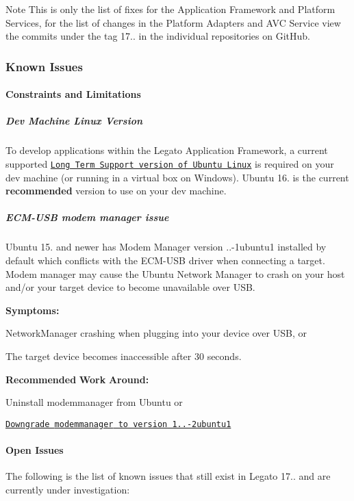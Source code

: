 \begin{DoxyNote}{Note}
This is only the list of fixes for the Application Framework and Platform Services, for the list of changes in the Platform Adapters and A\+VC Service view the commits under the tag 17.. in the individual repositories on Git\+Hub.
\end{DoxyNote}
\hypertarget{releaseNotes17100_rn1710_KnownIssues}{}\subsubsection{Known Issues}\label{releaseNotes17100_rn1710_KnownIssues}
\hypertarget{releaseNotes17100_rn1710_Constraints}{}\paragraph{Constraints and Limitations}\label{releaseNotes17100_rn1710_Constraints}
\hypertarget{releaseNotes17100_rn1710_ContraintsLinuxSupport}{}\subparagraph{Dev Machine Linux Version}\label{releaseNotes17100_rn1710_ContraintsLinuxSupport}
To develop applications within the Legato Application Framework, a current supported \href{https://www.ubuntu.com/info/release-end-of-life}{\tt Long Term Support version of Ubuntu Linux} is required on your dev machine (or running in a virtual box on Windows). Ubuntu 16. is the current {\bfseries recommended} version to use on your dev machine.\hypertarget{releaseNotes17100_rn1710_ConstECMUSB}{}\subparagraph{E\+C\+M-\/\+U\+S\+B modem manager issue}\label{releaseNotes17100_rn1710_ConstECMUSB}
Ubuntu 15. and newer has Modem Manager version {..-\/1ubuntu1} installed by default which conflicts with the E\+C\+M-\/\+U\+SB driver when connecting a target. Modem manager may cause the Ubuntu Network Manager to crash on your host and/or your target device to become unavailable over U\+SB.

{\bfseries Symptoms\+:} 
\begin{DoxyItemize}
\item Network\+Manager crashing when plugging into your device over U\+SB, or
\item The target device becomes inaccessible after 30 seconds.
\end{DoxyItemize}

{\bfseries Recommended} {\bfseries Work} {\bfseries Around\+:} 
\begin{DoxyItemize}
\item Uninstall {\ttfamily modemmanager} from Ubuntu or
\item \href{http://packages.ubuntu.com/trusty/modemmanager}{\tt Downgrade {\ttfamily modemmanager} to version 1..-\/2ubuntu1}
\end{DoxyItemize}\hypertarget{releaseNotes17100_rn1710_OpenIssues}{}\paragraph{Open Issues}\label{releaseNotes17100_rn1710_OpenIssues}
The following is the list of known issues that still exist in Legato 17.. and are currently under investigation\+:

